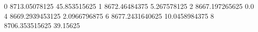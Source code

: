 0 8713.05078125 45.853515625
1 8672.46484375 5.267578125
2 8667.197265625 0.0
4 8669.2939453125 2.0966796875
6 8677.2431640625 10.0458984375
8 8706.353515625 39.15625
